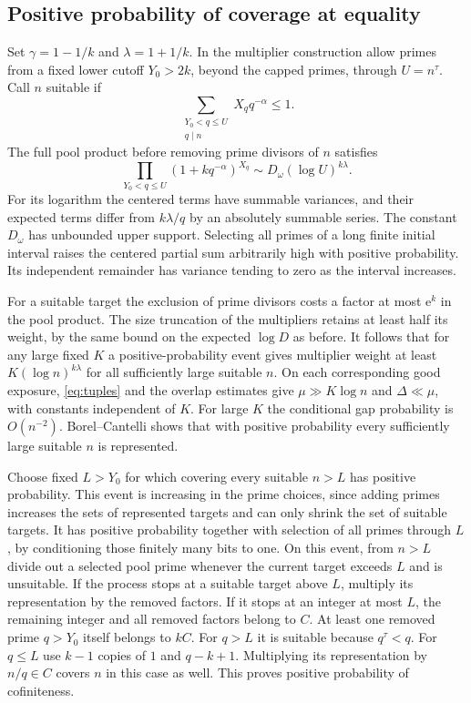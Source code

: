 \documentclass[11pt]{article}
\newcommand{\e}{\mathrm e}
\begin{document}
\subsection{Positive probability of coverage at equality}

Set \(\gamma=1-1/k\) and \(\lambda=1+1/k\). In the multiplier
construction allow primes from a fixed lower cutoff \(Y_0>2k\),
beyond the capped primes, through \(U=n^\tau\). Call \(n\)
suitable if
\[
           \sum_{\substack{Y_0<q\le U\\q\mid n}}X_q q^{-\alpha}\le1 .
\]
The full pool product before removing prime divisors of \(n\)
satisfies
\[
       \prod_{Y_0<q\le U}(1+kq^{-\alpha})^{X_q}
            \sim D_\omega(\log U)^{k\lambda}.
\]
For its logarithm the centered terms have summable variances,
and their expected terms differ from \(k\lambda/q\) by an
absolutely summable series. The constant \(D_\omega\) has
unbounded upper support. Selecting all primes of a long finite
initial interval raises the centered partial sum arbitrarily
high with positive probability. Its independent remainder has
variance tending to zero as the interval increases.

For a suitable target the exclusion of prime divisors costs
a factor at most \(\e^k\) in the pool product. The size
truncation of the multipliers retains at least half its weight,
by the same bound on the expected \(\log D\) as before.
It follows that for any large fixed \(K\) a positive-probability
event gives multiplier weight at least \(K(\log n)^{k\lambda}\)
for all sufficiently large suitable \(n\). On each corresponding
good exposure, \eqref{eq:tuples} and the overlap estimates give
\(\mu\gg K\log n\) and \(\Delta\ll\mu\), with constants independent
of \(K\). For large \(K\) the conditional gap probability is
\(O(n^{-2})\). Borel--Cantelli shows that with positive probability
every sufficiently large suitable \(n\) is represented.

Choose fixed \(L>Y_0\) for which covering every suitable \(n>L\)
has positive probability. This event is increasing in the prime
choices, since adding primes increases the sets of represented
targets and can only shrink the set of suitable targets.
It has positive probability together with selection of all
primes through \(L\), by conditioning those finitely many bits
to one. On this event, from \(n>L\) divide out a selected pool
prime whenever the current target exceeds \(L\) and is unsuitable.
If the process stops at a suitable target above \(L\),
multiply its representation by the removed factors.
If it stops at an integer at most \(L\), the remaining integer
and all removed factors belong to \(C\). At least one removed
prime \(q>Y_0\) itself belongs to \(kC\). For \(q>L\) it is
suitable because \(q^\tau<q\). For \(q\le L\) use \(k-1\) copies
of \(1\) and \(q-k+1\). Multiplying its representation by
\(n/q\in C\) covers \(n\) in this case as well.
This proves positive probability of cofiniteness.
\end{document}
